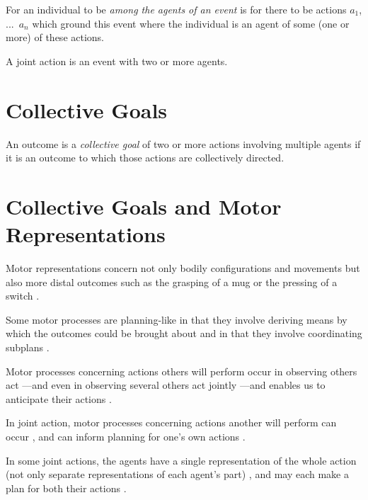 \documentclass[12pt]{extarticle}
\begin{document}
\begin{multicols*}{3}
For an individual to be \emph{among the agents of an event} is for there to be actions $a_1$, ...\ $a_n$ which ground this event where the individual is an agent of some (one or more) of these actions.

A joint action is an event with two or more agents.\citep{ludwig_collective_2007}



\section{Collective Goals}

An outcome is a \emph{collective goal} of two or more actions involving multiple
agents if it is an outcome to which those actions are collectively directed.



\section{Collective Goals and Motor Representations}

Motor representations concern not only bodily configurations and movements but also more distal
outcomes such as the grasping of a mug or the pressing of a switch
\citep{butterfill:2012_intention,hamilton:2008_action,cattaneo:2009_representation}.

Some motor processes are planning-like in that they involve deriving means by which the outcomes could
be brought about and in that they involve coordinating subplans
\citep{jeannerod_motor_2006,zhang:2007_planning}.

Motor processes concerning actions others will perform occur in observing others act
\citep{Gangitano:2001ft}---and even in observing several others act jointly
\citep{manera:2013_time}---and enables us to anticipate their actions
\citep{ambrosini:2011_grasping,aglioti_action_2008}.

In joint action, motor processes concerning actions another will perform can occur
\citep{kourtis:2012_predictive, meyer:2011_joint}, and can inform planning for one's own actions
\citep{vesper:2012_jumping,novembre:2013_motor,loehr:2011_temporal}.

In some joint actions, the agents have a single representation of the whole action (not only separate
representations of each agent's part)
\citep{tsai:2011_groop_effect,loehr:2013_monitoring,Menoret:2013fk}, and may each make a plan for both
their actions \citep{meyer:2013_higher-order,kourtis:2014_attention}.


\end{multicols*}
\end{document}
